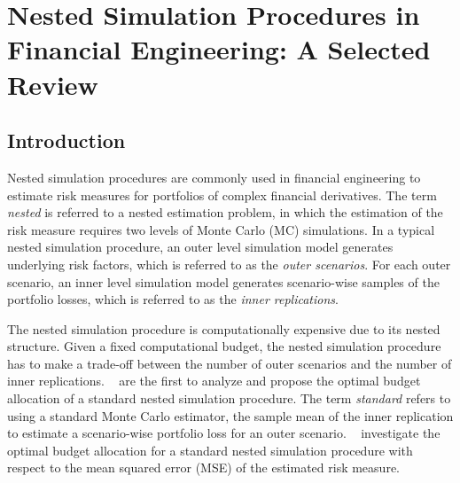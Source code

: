 \chapter{Nested Simulation Procedures in Financial Engineering: A Selected Review}


\section{Introduction}

Nested simulation procedures are commonly used in financial engineering to estimate risk measures for portfolios of complex financial derivatives. 
The term \textit{nested} is referred to a nested estimation problem, in which the estimation of the risk measure requires two levels of Monte Carlo (MC) simulations.
In a typical nested simulation procedure, an outer level simulation model generates underlying risk factors, which is referred to as the \textit{outer scenarios}.
For each outer scenario, an inner level simulation model generates scenario-wise samples of the portfolio losses, which is referred to as the \textit{inner replications}.

The nested simulation procedure is computationally expensive due to its nested structure. 
Given a fixed computational budget, the nested simulation procedure has to make a trade-off between the number of outer scenarios and the number of inner replications.
~\cite{gordy2010nested} are the first to analyze and propose the optimal budget allocation of a standard nested simulation procedure. 
The term \textit{standard} refers to using a standard Monte Carlo estimator, the sample mean of the inner replication to estimate a scenario-wise portfolio loss for an outer scenario.
~\cite{gordy2010nested} investigate the optimal budget allocation for a standard nested simulation procedure with respect to the mean squared error (MSE) of the estimated risk measure.

